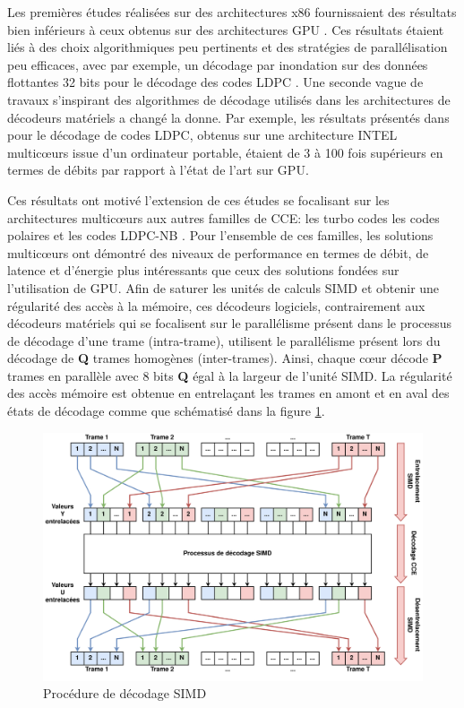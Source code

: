 \documentclass[../main.tex]{subfiles}
\begin{document}
Les premières études réalisées sur des architectures x86 fournissaient des résultats bien inférieurs à ceux obtenus sur des architectures GPU \cite{massive:gpu}. Ces résultats étaient liés à des choix algorithmiques peu pertinents et des stratégies de parallélisation peu efficaces, avec par exemple, un décodage par inondation sur des données flottantes 32 bits pour le décodage des codes LDPC \cite{Chang:ldpc}. Une seconde vague de travaux s’inspirant des algorithmes de décodage utilisés dans les architectures de décodeurs matériels a changé la donne. Par exemple, les résultats présentés dans \cite{BLG:REVUE:TPDS} pour le décodage de codes LDPC, obtenus sur une architecture INTEL multicœurs issue d’un ordinateur portable, étaient de 3 à 100 fois supérieurs en termes de débits par rapport à l’état de l’art sur GPU.

Ces résultats ont motivé l’extension de ces études se focalisant sur les architectures multicœurs aux autres familles de CCE: les turbo codes \cite{BLG:TURBO} les codes polaires \cite{ri:LeG15a,mcgill} et les codes LDPC-NB \cite{BLG:LDPC:NB}. Pour l’ensemble de ces familles, les solutions multicœurs ont démontré des niveaux de performance en termes de débit, de latence et d’énergie plus intéressants que ceux des solutions fondées sur l’utilisation de GPU.
Afin de saturer les unités de calculs SIMD et obtenir une régularité des accès à la mémoire, ces décodeurs logiciels, contrairement aux décodeurs matériels qui se focalisent sur le parallélisme présent dans le processus de décodage d’une trame (intra-trame), utilisent le parallélisme présent lors du décodage de \textbf{Q} trames homogènes (inter-trames). Ainsi, chaque cœur décode \textbf{P} trames en parallèle avec 8 bits \times \textbf{Q} égal à la largeur de l’unité SIMD. La régularité des accès mémoire est obtenue en entrelaçant les trames en amont et en aval des états de décodage comme que schématisé dans la figure \ref{fig:simd}.

\begin{figure}
    \centering
    \includegraphics[scale=.08]{figs/SIMD.png}
    \caption{Procédure de décodage SIMD}
    \label{fig:simd}
\end{figure}
\end{document}
